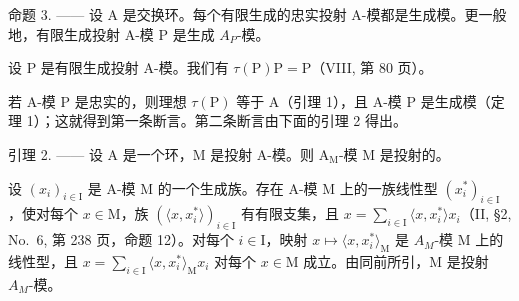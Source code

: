 命题 3. —— 设 A 是交换环。每个有限生成的忠实投射 A-模都是生成模。更一般地，有限生成投射 A-模 P 是生成 \(A_{P}\)-模。

设 P 是有限生成投射 A-模。我们有 \(\tau(\mathrm{P})\mathrm{P}=\mathrm{P}\)（VIII, 第 80 页）。

若 A-模 P 是忠实的，则理想 \(\tau(\mathrm{P})\) 等于 A（引理 1），且 A-模 P 是生成模（定理 1）；这就得到第一条断言。第二条断言由下面的引理 2 得出。

引理 2. —— 设 A 是一个环，M 是投射 A-模。则 \(\mathrm{A_M}\)-模 M 是投射的。

设 \((x_{i})_{i\in\mathrm{I}}\) 是 A-模 M 的一个生成族。存在 A-模 M 上的一族线性型 \((x_{i}^{*})_{i\in\mathrm{I}}\)，使对每个 \(x\in\mathrm{M}\)，族 \((\langle x,x_{i}^{*}\rangle)_{i\in\mathrm{I}}\) 有有限支集，且 \(x=\sum_{i\in\mathrm{I}}\langle x,x_{i}^{*}\rangle x_{i}\)（II, §2, No.~6, 第 238 页，命题 12）。对每个 \(i\in\mathrm{I}\)，映射 \(x\mapsto\langle x,x_{i}^{*}\rangle_{\mathrm{M}}\) 是 \(A_{M}\)-模 M 上的线性型，且 \(x=\sum_{i\in\mathrm{I}}\langle x,x_{i}^{*}\rangle_{\mathrm{M}}x_{i}\) 对每个 \(x\in\mathrm{M}\) 成立。由同前所引，M 是投射 \(A_{M}\)-模。

